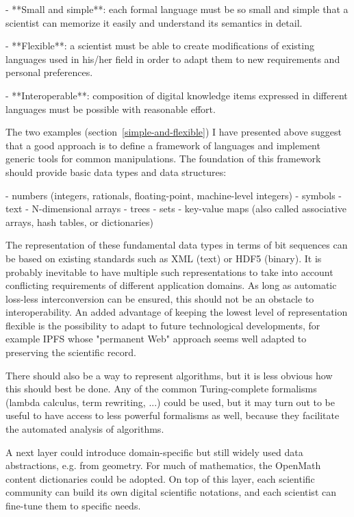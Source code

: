  - **Small and simple**: each formal language must be so small and simple that a scientist can memorize it easily and understand its semantics in detail.

 - **Flexible**: a scientist must be able to create modifications of existing languages used in his/her field in order to adapt them to new requirements and personal preferences.

 - **Interoperable**: composition of digital knowledge items expressed in different languages must be possible with reasonable effort.

The two examples (section~\ref{simple-and-flexible}) I have presented above suggest that a good approach is to define a framework of languages and implement generic tools for common manipulations. The foundation of this framework should provide basic data types and data structures:

 - numbers (integers, rationals, floating-point, machine-level integers)
 - symbols
 - text
 - N-dimensional arrays
 - trees
 - sets
 - key-value maps (also called associative arrays, hash tables, or dictionaries)

The representation of these fundamental data types in terms of bit sequences can be based on existing standards such as XML (text) or HDF5 (binary). It is probably inevitable to have multiple such representations to take into account conflicting requirements of different application domains. As long as automatic loss-less interconversion can be ensured, this should not be an obstacle to interoperability. An added advantage of keeping the lowest level of representation flexible is the possibility to adapt to future technological developments, for example IPFS \cite{benet_ipfs_2014} whose "permanent Web" approach seems well adapted to preserving the scientific record.

There should also be a way to represent algorithms, but it is less obvious how this should best be done. Any of the common Turing-complete formalisms (lambda calculus, term rewriting, ...) could be used, but it may turn out to be useful to have access to less powerful formalisms as well, because they facilitate the automated analysis of algorithms.

A next layer could introduce domain-specific but still widely used data abstractions, e.g. from geometry. For much of mathematics, the OpenMath content dictionaries \cite{openmath_society_openmath_2000} could be adopted. On top of this layer, each scientific community can build its own digital scientific notations, and each scientist can fine-tune them to specific needs.

